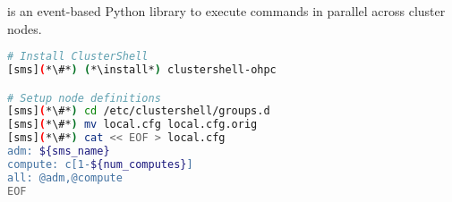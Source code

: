 \clustershell{} is an event-based Python library to execute commands in parallel
across cluster nodes. 

\begin{lstlisting}[language=bash,keywords={},upquote=true]
# Install ClusterShell
[sms](*\#*) (*\install*) clustershell-ohpc

# Setup node definitions
[sms](*\#*) cd /etc/clustershell/groups.d
[sms](*\#*) mv local.cfg local.cfg.orig
[sms](*\#*) cat << EOF > local.cfg
adm: ${sms_name}
compute: c[1-${num_computes}]
all: @adm,@compute
EOF
\end{lstlisting}

